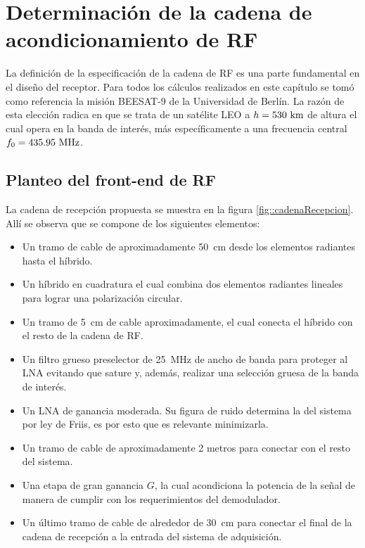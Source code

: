 \documentclass[../../main.tex]{subfiles}
\begin{document}
\chapter{Determinación de la cadena de acondicionamiento de RF}

La definición de la especificación de la cadena de RF es una parte fundamental en el diseño del receptor. Para todos los cálculos realizados en este capítulo se tomó como referencia la misión BEESAT-9 \cite{BEESAT-9} de la Universidad de Berlín. La razón de esta elección radica en que se trata de un satélite LEO a $h = 530~\textrm{km}$ de altura el cual opera en la banda de interés, más específicamente a una frecuencia central $f_0 = 435.95~\textrm{MHz}$.

\section{Planteo del front-end de RF}
La cadena de recepción propuesta se muestra en la figura \ref{fig::cadenaRecepcion}. Allí se observa que se compone de los siguientes elementos:
\begin{itemize}
    \item Un tramo de cable de aproximadamente 50~cm desde los elementos radiantes hasta el híbrido.
    \item Un híbrido en cuadratura el cual combina dos elementos radiantes lineales para lograr una polarización circular.
    \item Un tramo de 5~cm de cable aproximadamente, el cual conecta el híbrido con el resto de la cadena de RF.
    \item Un filtro grueso preselector de 25~MHz de ancho de banda para proteger al LNA evitando que sature y, además, realizar una selección gruesa de la banda de interés.
    \item Un LNA de ganancia moderada. Su figura de ruido determina la del sistema por ley de Friis, es por esto que es relevante minimizarla.
    \item Un tramo de cable de aproximadamente 2 metros para conectar con el resto del sistema.
    \item Una etapa de gran ganancia $G$, la cual acondiciona la potencia de la señal de manera de cumplir con los requerimientos del demodulador.
    \item Un último tramo de cable de alrededor de 30~cm para conectar el final de la cadena de recepción a la entrada del sistema de adquisición.
\end{itemize}
\end{document}
